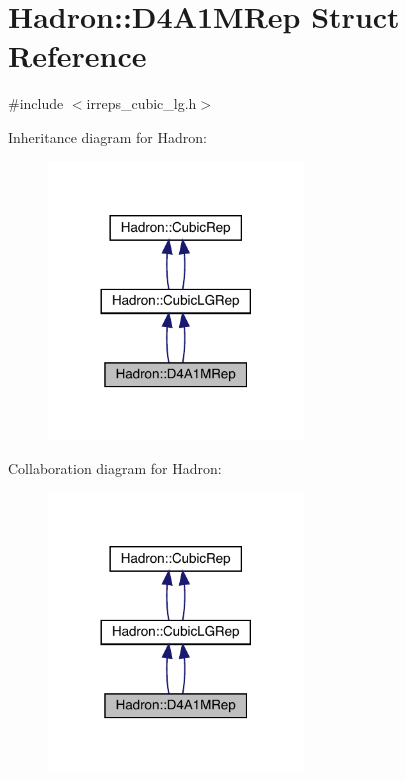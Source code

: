 \hypertarget{structHadron_1_1D4A1MRep}{}\section{Hadron\+:\+:D4\+A1\+M\+Rep Struct Reference}
\label{structHadron_1_1D4A1MRep}


{\ttfamily \#include $<$irreps\+\_\+cubic\+\_\+lg.\+h$>$}



Inheritance diagram for Hadron\+:\nopagebreak
\begin{figure}[H]
\begin{center}
\leavevmode
\includegraphics[width=192pt]{d7/d70/structHadron_1_1D4A1MRep__inherit__graph}
\end{center}
\end{figure}


Collaboration diagram for Hadron\+:\nopagebreak
\begin{figure}[H]
\begin{center}
\leavevmode
\includegraphics[width=192pt]{d2/d57/structHadron_1_1D4A1MRep__coll__graph}
\end{center}
\end{figure}
